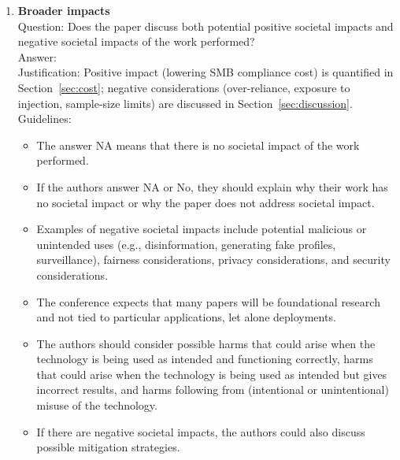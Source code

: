 \documentclass{article}
\begin{document}
\begin{enumerate}
\item {\bf Broader impacts}\\
Question: Does the paper discuss both potential positive societal impacts and negative societal impacts of the work performed?\\
Answer: \answerYes{}\\
Justification: Positive impact (lowering SMB compliance cost) is quantified in Section~\ref{sec:cost}; negative considerations (over-reliance, exposure to injection, sample-size limits) are discussed in Section~\ref{sec:discussion}.\\
Guidelines:
\begin{itemize}
\item The answer NA means that there is no societal impact of the work performed.
\item If the authors answer NA or No, they should explain why their work has no societal impact or why the paper does not address societal impact.
\item Examples of negative societal impacts include potential malicious or unintended uses (e.g., disinformation, generating fake profiles, surveillance), fairness considerations, privacy considerations, and security considerations.
\item The conference expects that many papers will be foundational research and not tied to particular applications, let alone deployments.
\item The authors should consider possible harms that could arise when the technology is being used as intended and functioning correctly, harms that could arise when the technology is being used as intended but gives incorrect results, and harms following from (intentional or unintentional) misuse of the technology.
\item If there are negative societal impacts, the authors could also discuss possible mitigation strategies.
\end{itemize}


\end{enumerate}
\end{document}
